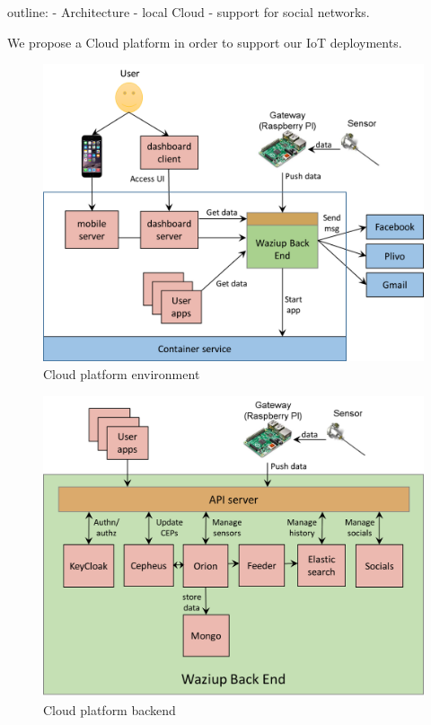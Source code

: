 \documentclass[10pt, conference, compsocconf]{IEEEtran}
\newcommand {\0} {\mathbf 0}
\newcommand {\1} {\mathbf 1}
\begin{document}
\begin{markdown}
outline:
- Architecture
- local Cloud
- support for social networks. 
\end{markdown}

We propose a Cloud platform in order to support our IoT deployments.

\begin{figure} 
\centering  
\includegraphics[width=.9\linewidth]{figs/CloudEnv}   
\caption{Cloud platform environment}   
\label{fig:cloudenv}  
\end{figure} 

\begin{figure} 
\centering  
\includegraphics[width=.9\linewidth]{figs/BackEnd}   
\caption{Cloud platform backend}   
\label{fig:backend}  
\end{figure} 
\end{document}

